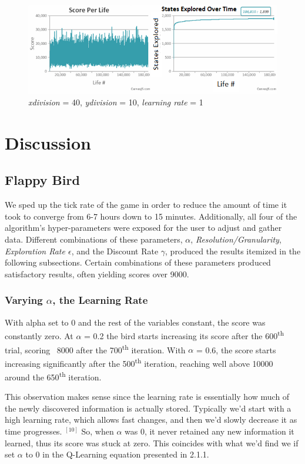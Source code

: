 \documentclass[a4paper, 12pt]{article}
\begin{document}
    \begin{figure}[H]
\centering
\includegraphics[scale=0.6]{x40y10rate1.png}
\caption{\textit{xdivision} = 40, \textit{ydivision} = 10, \textit{learning rate} = 1}
\end{figure}



\section{Discussion}
\subsection{Flappy Bird}

We sped up the tick rate of the game in order to reduce the amount of time it took to converge from 6-7 hours down to 15 minutes. Additionally, all four of the algorithm's hyper-parameters were exposed for the user to adjust and gather data. Different combinations of these parameters, $\alpha$, \textit{Resolution/Granularity}, \textit{Exploration Rate $\epsilon$}, and the Discount Rate $\gamma$, produced the results itemized in the following subsections. Certain combinations of these parameters produced satisfactory results, often yielding scores over 9000.

\subsubsection{Varying $\alpha$, the Learning Rate}

With alpha set to 0 and the rest of the variables constant, the score was constantly zero. At $\alpha$ = 0.2 the bird starts increasing its score after the 600\textsuperscript{th} trial, scoring ~8000 after the 700\textsuperscript{th} iteration. With $\alpha$ = 0.6, the score starts increasing significantly after the 500\textsuperscript{th} iteration, reaching well above 10000 around the 650\textsuperscript{th} iteration.

This observation makes sense since the learning rate is essentially how much of the newly discovered information is actually stored. Typically we'd start with a high learning rate, which allows fast changes, and then we'd slowly decrease it as time progresses. $^{[10]}$ So, when $\alpha$ was 0, it never retained any new information it learned, thus its score was stuck at zero. This coincides with what we'd find we if set $\alpha$ to 0 in the Q-Learning equation presented in 2.1.1.
\end{document}
